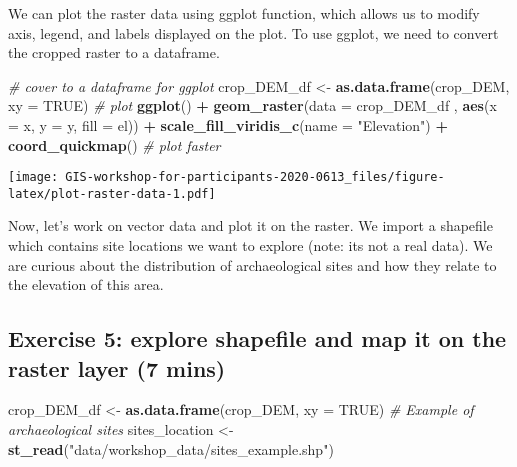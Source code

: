 \documentclass[
  xelatex,ja=standard]{bxjsarticle}
\newenvironment{Shaded}{\begin{snugshade}}{\end{snugshade}}
\newcommand{\CommentTok}[1]{\textcolor[rgb]{0.56,0.35,0.01}{\textit{#1}}}
\newcommand{\DataTypeTok}[1]{\textcolor[rgb]{0.13,0.29,0.53}{#1}}
\newcommand{\KeywordTok}[1]{\textcolor[rgb]{0.13,0.29,0.53}{\textbf{#1}}}
\newcommand{\NormalTok}[1]{#1}
\newcommand{\OperatorTok}[1]{\textcolor[rgb]{0.81,0.36,0.00}{\textbf{#1}}}
\newcommand{\OtherTok}[1]{\textcolor[rgb]{0.56,0.35,0.01}{#1}}
\newcommand{\StringTok}[1]{\textcolor[rgb]{0.31,0.60,0.02}{#1}}
\begin{document}
We can plot the raster data using ggplot function, which allows us to
modify axis, legend, and labels displayed on the plot. To use ggplot, we
need to convert the cropped raster to a dataframe.

\begin{Shaded}
\begin{Highlighting}[]
\CommentTok{# cover to a dataframe for ggplot}
\NormalTok{crop_DEM_df <-}\StringTok{ }\KeywordTok{as.data.frame}\NormalTok{(crop_DEM, }\DataTypeTok{xy =} \OtherTok{TRUE}\NormalTok{)}
\CommentTok{# plot}
\KeywordTok{ggplot}\NormalTok{() }\OperatorTok{+}
\StringTok{  }\KeywordTok{geom_raster}\NormalTok{(}\DataTypeTok{data =}\NormalTok{ crop_DEM_df , }\KeywordTok{aes}\NormalTok{(}\DataTypeTok{x =}\NormalTok{ x, }\DataTypeTok{y =}\NormalTok{ y, }\DataTypeTok{fill =}\NormalTok{ el)) }\OperatorTok{+}
\StringTok{  }\KeywordTok{scale_fill_viridis_c}\NormalTok{(}\DataTypeTok{name =} \StringTok{"Elevation"}\NormalTok{) }\OperatorTok{+}
\StringTok{  }\KeywordTok{coord_quickmap}\NormalTok{() }\CommentTok{# plot faster}
\end{Highlighting}
\end{Shaded}

\texttt{[image: GIS-workshop-for-participants-2020-0613\_files/figure-latex/plot-raster-data-1.pdf]}

Now, let's work on vector data and plot it on the raster. We import a
shapefile which contains site locations we want to explore (note: its
not a real data). We are curious about the distribution of
archaeological sites and how they relate to the elevation of this area.

\hypertarget{exercise-5-explore-shapefile-and-map-it-on-the-raster-layer-7-mins}{%
\subsection{Exercise 5: explore shapefile and map it on the raster layer
(7
mins)}\label{exercise-5-explore-shapefile-and-map-it-on-the-raster-layer-7-mins}}

\begin{Shaded}
\begin{Highlighting}[]
\NormalTok{crop_DEM_df <-}\StringTok{ }\KeywordTok{as.data.frame}\NormalTok{(crop_DEM, }\DataTypeTok{xy =} \OtherTok{TRUE}\NormalTok{)}
\CommentTok{# Example of archaeological sites}
\NormalTok{sites_location <-}\StringTok{ }\KeywordTok{st_read}\NormalTok{(}\StringTok{"data/workshop_data/sites_example.shp"}\NormalTok{)}
\end{Highlighting}
\end{Shaded}
\end{document}
